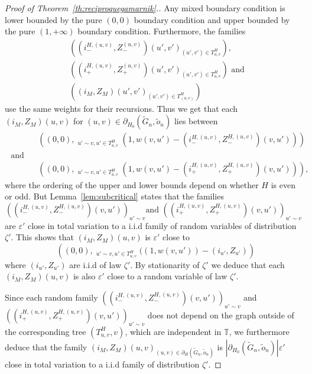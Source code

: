 \documentclass[11pt]{article}
\DeclareMathOperator{\lex}{lex}
\DeclareMathOperator*{\maxlex}{\overset{\lex}{\max}}
\newcommand{\eps}{\varepsilon}
\begin{document}
\begin{proof}[Proof of Theorem~\ref{th:reciproquegamarnik}.]
Any mixed boundary condition is lower bounded by the pure $(0,0)$ boundary condition and upper bounded by the pure $(1,+\infty)$ boundary condition. Furthermore, the families 
\begin{align*}
&\left((i_-^{H,(u,v)},Z_-^{(u,v)})(u',v')_{(u',v') \in T_{u,v}^{H}}\right), \\ &\left( (i_+^{H,(u,v)},Z_+^{(u,v)})(u',v')_{(u',v') \in T_{u,v}^{H}} \right)  \text{ and}\\ &\left((i_M,Z_M)(u',v')_{ (u',v')  \in T_{(u,v)}^{H}} \right) 
\end{align*} use the same weights for their recursions. Thus we get that 
each $(i_M,Z_M)(u,v)$ for $(u,v) \in \partial_{H_0}(\tilde{G}_n,\tilde{o}_n)$ lies between
\begin{align*}
    &\maxlex \left( (0,0),\maxlex_{u' \sim v, u' \in T_{u,v}^{H}} (1,w(v,u')-(i_-^{H,(u,v)},Z_-^{H,(u,v)})(v,u')  )\right)\\ \text{ and } \\
    &\maxlex \left( (0,0),\maxlex_{u' \sim v, u' \in T_{u,v}^{H}} (1,w(v,u')-(i_+^{H,(u,v)},Z_+^{H,(u,v)})(v,u') ) \right),
\end{align*}
where the ordering of the upper and lower bounds depend on whether $H$ is even or odd.
But Lemma~\ref{lem:subcritical} states that the families \[\left((i_-^{H,(u,v)},Z_-^{H,(u,v)})(v,u')\right)_{u' \sim v} \text{and }\left((i_+^{H,(u,v)},Z_+^{H,(u,v)})(v,u')\right)_{u' \sim v}\] are $\eps'$ close in total variation to a i.i.d family of random variables of distribution $\zeta'$.
This shows that $(i_M,Z_M)(u,v)$ is $\eps'$ close to 
\[\maxlex \left( (0,0),\maxlex_{u' \sim v, u' \in T_{u,v}^{H}} ((1,w(v,u'))- (i_{u'},Z_{u'} ) \right) \]
where $(i_{u'},Z_{u'})$ are i.i.d of law $\zeta'$. By stationarity of $\zeta'$ we deduce that each $(i_M,Z_M)(u,v)$ is also $\eps'$ close to a random variable of law $\zeta'$.

Since each random family $\left((i_-^{H,(u,v)},Z_-^{H,(u,v)})(v,u')\right)_{u' \sim v}$ and $\left((i_+^{H,(u,v)},Z_+^{H,(u,v)})(v,u')\right)_{u' \sim v}$ does not depend on the graph outside of the corresponding tree $(T_{u,v}^{H},v)$, which are independent in $\mathbb{T}$, we furthermore deduce that the family $(i_M,Z_M)(u,v)_{(u,v) \in \partial_H(\tilde{G}_n, \tilde{o}_n)}$ is $ |\partial_{H_0}(\tilde{G}_n,\tilde{o}_n) | \eps'$ close in total variation to a i.i.d family of distribution $\zeta'$. 


\end{proof}
\end{document}
